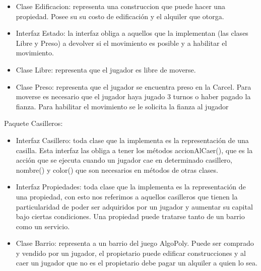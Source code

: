 \documentclass[titlepage,a4paper]{article}
\begin{document}
\begin{itemize}
\item
Clase Edificacion: representa una construccion que puede hacer una propiedad. Posee su su costo de edificación y el alquiler que otorga.
\end{itemize}

\begin{itemize}
\item 
Interfaz Estado: la interfaz obliga a aquellos que la implementan (las clases Libre y Preso) a devolver si el movimiento es posible y a habilitar el movimiento.
\end{itemize}

\begin{itemize}
\item 
Clase Libre: representa que el jugador es libre de moverse.
\end{itemize}

\begin{itemize}
\item 
Clase Preso: representa que el jugador se encuentra preso en la Carcel. Para moverse es necesario que el jugador haya jugado 3 turnos o haber pagado la fianza. Para habilitar el movimiento se le solicita la fianza al jugador
\end{itemize}

Paquete Casilleros:

\begin{itemize}
\item 
Interfaz Casillero: toda clase que la implementa es la representación de una casilla. Esta interfaz las obliga a tener los métodos accionAlCaer(), que es la acción que se ejecuta cuando un jugador cae en determinado casillero, nombre() y color() que son necesarios en métodos de otras clases.
\end{itemize}

\begin{itemize}
\item 
Interfaz Propiedades: toda clase que la implementa es la representación de una propiedad, con esto nos referimos a aquellos casilleros que tienen la particularidad de poder ser adquiridos por un jugador y aumentar su capital bajo ciertas condiciones. Una propiedad puede tratarse tanto de un barrio como un servicio.
\end{itemize}

\begin{itemize}
\item 
Clase Barrio: representa a un barrio del juego AlgoPoly. Puede ser comprado y vendido por un jugador, el propietario puede edificar construcciones y al caer un jugador que no es el propietario debe pagar un alquiler a quien lo sea.
\end{itemize}
\end{document}
